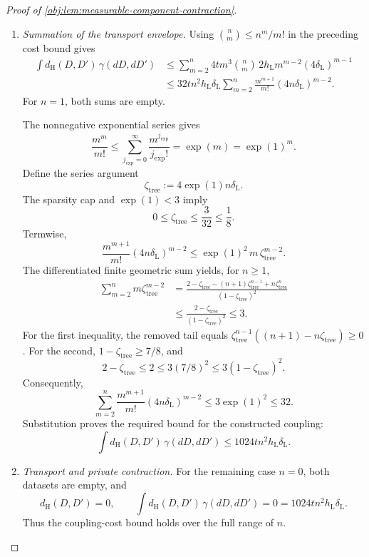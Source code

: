 \documentclass[11pt]{article}
\begin{document}
\begin{proof}[Proof of \cref{obj:lem:measurable-component-contraction}]
\begin{enumerate}
\item \textit{Summation of the transport envelope.}
Using \(\binom nm\le n^m/m!\) in the preceding cost bound gives
\[
\begin{aligned}
\int d_{\mathrm H}(D,D')\,\gamma(dD,dD')
&\le
\sum_{m=2}^n
4tm^3\binom nm\,2h_{\mathrm L}m^{m-2}
 (4\delta_{\mathrm L})^{m-1}\\
&\le
32tn^2h_{\mathrm L}\delta_{\mathrm L}
\sum_{m=2}^n
\frac{m^{m+1}}{m!}(4n\delta_{\mathrm L})^{m-2}.
\end{aligned}
\]
For \(n=1\), both sums are empty.

The nonnegative exponential series gives
\[
\frac{m^m}{m!}
\le
\sum_{j_{\mathrm{exp}}=0}^{\infty}
 \frac{m^{j_{\mathrm{exp}}}}{j_{\mathrm{exp}}!}
=\exp(m)
=\exp(1)^m.
\]
Define the series argument
\[
\zeta_{\mathrm{tree}}
:=4\exp(1)n\delta_{\mathrm L}.
\]
The sparsity cap and \(\exp(1)<3\) imply
\[
0\le\zeta_{\mathrm{tree}}
\le\frac3{32}
\le\frac18.
\]
Termwise,
\[
\frac{m^{m+1}}{m!}(4n\delta_{\mathrm L})^{m-2}
\le
\exp(1)^2\,m\,\zeta_{\mathrm{tree}}^{m-2}.
\]
The differentiated finite geometric sum yields, for \(n\ge1\),
\[
\begin{aligned}
\sum_{m=2}^n m\zeta_{\mathrm{tree}}^{m-2}
&=
\frac{
2-\zeta_{\mathrm{tree}}
-(n+1)\zeta_{\mathrm{tree}}^{n-1}
+n\zeta_{\mathrm{tree}}^n
}{(1-\zeta_{\mathrm{tree}})^2}\\
&\le
\frac{2-\zeta_{\mathrm{tree}}}
 {(1-\zeta_{\mathrm{tree}})^2}
\le3.
\end{aligned}
\]
For the first inequality, the removed tail equals
\(\zeta_{\mathrm{tree}}^{n-1}
 ((n+1)-n\zeta_{\mathrm{tree}})\ge0\).
For the second, \(1-\zeta_{\mathrm{tree}}\ge7/8\), and
\[
2-\zeta_{\mathrm{tree}}
\le2
\le3(7/8)^2
\le3(1-\zeta_{\mathrm{tree}})^2.
\]
Consequently,
\[
\sum_{m=2}^n
\frac{m^{m+1}}{m!}(4n\delta_{\mathrm L})^{m-2}
\le3\exp(1)^2
\le32.
\]
Substitution proves the required bound for the constructed coupling:
\[
\int d_{\mathrm H}(D,D')\,\gamma(dD,dD')
\le1024tn^2h_{\mathrm L}\delta_{\mathrm L}.
\]

\item \textit{Transport and private contraction.}
For the remaining case \(n=0\), both datasets are empty, and
\[
d_{\mathrm H}(D,D')=0,
\qquad
\int d_{\mathrm H}(D,D')\,\gamma(dD,dD')
=0
=1024tn^2h_{\mathrm L}\delta_{\mathrm L}.
\]
Thus the coupling-cost bound holds over the full range of \(n\).


\end{enumerate}
\end{proof}
\end{document}
